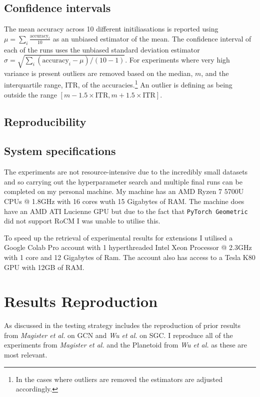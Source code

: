 \subsection{Confidence intervals}
\label{sec:reporting}
The mean accuracy across 10 different initiliasations is reported using $\mu = \sum_i\frac{\text{accuracy}_i}{10}$ as an unbiased estimator of the mean.
The confidence interval of each of the runs uses the unbiased standard deviation estimator $\sigma = \sqrt{\sum_i(\text{accuracy}_i - \mu)/(10 - 1)}$.
For experiments where very high variance is present outliers are removed based on the median, $m$, and the interquartile range, $\text{ITR}$, of the accuracies.\footnote{In the cases where outliers are removed the estimators are adjusted accordingly.}
An outlier is defining as being outside the range $[m - 1.5 \times \text{ITR}, m + 1.5 \times \text{ITR}]$.


\subsection{Reproducibility}

\subsection{System specifications}
The experiments are not resource-intensive due to the incredibly small datasets and so carrying out the hyperparameter search and multiple final runs can be completed on my personal machine.
My machine has an AMD Ryzen 7 5700U CPUs @ 1.8GHz with 16 cores wuth 15 Gigabytes of RAM.
The machine does have an AMD ATI Lucienne GPU but due to the fact that \texttt{PyTorch Geometric} did not support RoCM I was unable to utilise this.

To speed up the retrieval of experimental results for extensions I utilised a Google Colab Pro account with 1 hyperthreaded Intel Xeon Processor @ 2.3GHz with 1 core and 12 Gigabytes of Ram.
The account also has access to a Tesla K80 GPU with 12GB of RAM.


\section{Results Reproduction}
\label{sec:reproduction}

As discussed in  the testing strategy includes the reproduction of prior results from \textit{Magister et al.}\cite{magister2021gcexplainer} on GCN and \textit{Wu et al.}\cite{wu2019simplifying} on SGC.
I reproduce all of the experiments from \textit{Magister et al.} and the Planetoid\cite{kipf2016semi} from \textit{Wu et al.} as these are most relevant.

